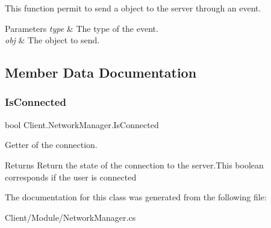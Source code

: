 This function permit to send a object to the server through an event. 
\begin{DoxyParams}{Parameters}
{\em type} & The type of the event. \\
\hline
{\em obj} & The object to send. \\
\hline
\end{DoxyParams}


\subsection{Member Data Documentation}
\mbox{\label{class_client_1_1_network_manager_a4be8908e8a6e14e5ac6f8ceb783e54cb}} 
\subsubsection{\texorpdfstring{Is\+Connected}{IsConnected}}
{\footnotesize\ttfamily bool Client.\+Network\+Manager.\+Is\+Connected}

Getter of the connection. \begin{DoxyReturn}{Returns}
Return the state of the connection to the server.\+This boolean corresponds if the user is connected 
\end{DoxyReturn}


The documentation for this class was generated from the following file\+:\begin{DoxyCompactItemize}
\item 
Client/\+Module/Network\+Manager.\+cs\end{DoxyCompactItemize}
